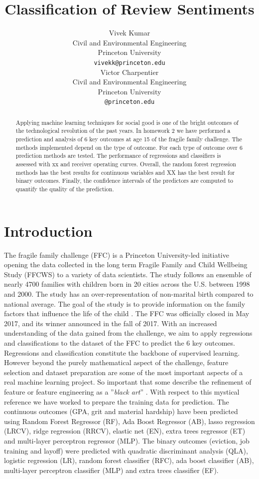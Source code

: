 \documentclass{article} %
\title{Classification of Review Sentiments}
\author{
Vivek Kumar\\
Civil and Environmental Engineering\\
Princeton University\\
\texttt{vivekk@princeton.edu} \\
\And
Victor Charpentier\\
Civil and Environmental Engineering\\
Princeton University\\
\texttt{@princeton.edu} \\
}
\begin{document}
\maketitle

\begin{abstract}
Applying machine learning techniques for social good is one of the bright outcomes of the technological revolution of the past years. In homework 2 we have performed a prediction and analysis of 6 key outcomes at age 15 of the fragile family challenge. The methods implemented depend on the type of outcome. For each type of outcome over 6 prediction methods are tested. The performance of regressions and classifiers is assessed with xx and receiver operating curves. Overall, the random forest regression methods has the best results for continuous variables and XX has the best result for binary outcomes. Finally, the confidence intervals of the predictors are computed to quantify the quality of the prediction.

\end{abstract}

\section{Introduction}
The fragile family challenge (FFC) is a Princeton University-led initiative opening the data collected in the long term Fragile Family and Child Wellbeing Study (FFCWS) to a variety of data scientists. The study follows an ensemble of nearly 4700 families with children born in 20 cities across the U.S. between 1998 and 2000. The study has an over-representation of non-marital birth compared to national average. The goal of the study is to provide information on the family factors that influence the life of the child  \cite{reichman2001fragile}. The FFC was officially closed in May 2017, and its winner announced in the fall of 2017. 
With an increased understanding of the data gained from the challenge, we aim to apply regressions and classifications to the dataset of the FFC to predict the 6 key outcomes. Regressions and classification constitute the backbone of supervised learning. However beyond the purely mathematical aspect of the challenge, feature selection and dataset preparation are some of the most important aspects of a real machine learning project. So important that some describe the refinement of feature or feature engineering as a ''\textit{black art}'' \cite{domingos2012few}. With respect to this mystical reference we have worked to prepare the training data for prediction. The continuous outcomes (GPA, grit and material hardship) have been predicted using Random Forest Regressor (RF), Ada Boost Regressor (AB), lasso regression (LRCV), ridge regression (RRCV), elastic net (EN), extra trees regressor (ET) and multi-layer perceptron regressor (MLP). The binary outcomes (eviction, job training and layoff) were predicted with quadratic discriminant analysis (QLA), logistic regression (LR), random forest classifier (RFC), ada boost classifier (AB),  multi-layer perceptron classifier (MLP) and extra trees classifier (EF).
\end{document}
